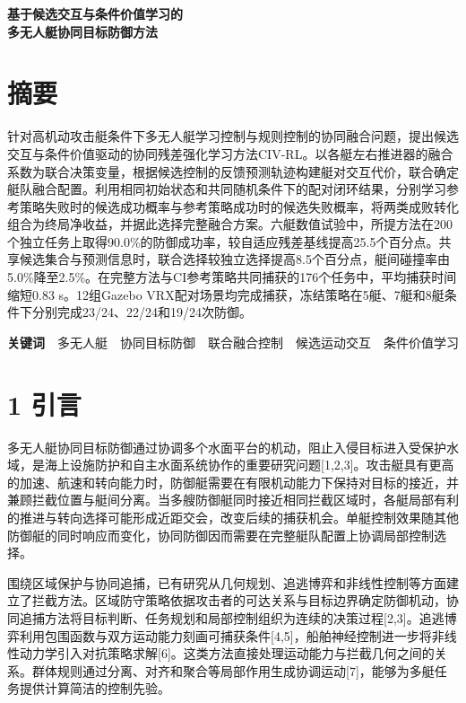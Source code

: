 \documentclass[UTF8,a4paper,zihao=5,fontset=none]{ctexart}
\begin{document}
\begin{center}\sffamily\bfseries\fontsize{18}{25}\selectfont
基于候选交互与条件价值学习的\\多无人艇协同目标防御方法
\end{center}\vspace{3pt}
\section*{摘要}

针对高机动攻击艇条件下多无人艇学习控制与规则控制的协同融合问题，提出候选交互与条件价值驱动的协同残差强化学习方法CIV-RL。以各艇左右推进器的融合系数为联合决策变量，根据候选控制的反馈预测轨迹构建艇对交互代价，联合确定艇队融合配置。利用相同初始状态和共同随机条件下的配对闭环结果，分别学习参考策略失败时的候选成功概率与参考策略成功时的候选失败概率，将两类成败转化组合为终局净收益，并据此选择完整融合方案。六艇数值试验中，所提方法在200个独立任务上取得90.0\%的防御成功率，较自适应残差基线提高25.5个百分点。共享候选集合与预测信息时，联合选择较独立选择提高8.5个百分点，艇间碰撞率由5.0\%降至2.5\%。在完整方法与CI参考策略共同捕获的176个任务中，平均捕获时间缩短0.83
s。12组Gazebo
VRX配对场景均完成捕获，冻结策略在5艇、7艇和8艇条件下分别完成23/24、22/24和19/24次防御。

\textbf{关键词}　多无人艇　协同目标防御　联合融合控制　候选运动交互　条件价值学习

\section*{1 引言}

多无人艇协同目标防御通过协调多个水面平台的机动，阻止入侵目标进入受保护水域，是海上设施防护和自主水面系统协作的重要研究问题{[}1,2,3{]}。攻击艇具有更高的加速、航速和转向能力时，防御艇需要在有限机动能力下保持对目标的接近，并兼顾拦截位置与艇间分离。当多艘防御艇同时接近相同拦截区域时，各艇局部有利的推进与转向选择可能形成近距交会，改变后续的捕获机会。单艇控制效果随其他防御艇的同时响应而变化，协同防御因而需要在完整艇队配置上协调局部控制选择。

围绕区域保护与协同追捕，已有研究从几何规划、追逃博弈和非线性控制等方面建立了拦截方法。区域防守策略依据攻击者的可达关系与目标边界确定防御机动，协同追捕方法将目标判断、任务规划和局部控制组织为连续的决策过程{[}2,3{]}。追逃博弈利用包围函数与双方运动能力刻画可捕获条件{[}4,5{]}，船舶神经控制进一步将非线性动力学引入对抗策略求解{[}6{]}。这类方法直接处理运动能力与拦截几何之间的关系。群体规则通过分离、对齐和聚合等局部作用生成协调运动{[}7{]}，能够为多艇任务提供计算简洁的控制先验。
\end{document}
